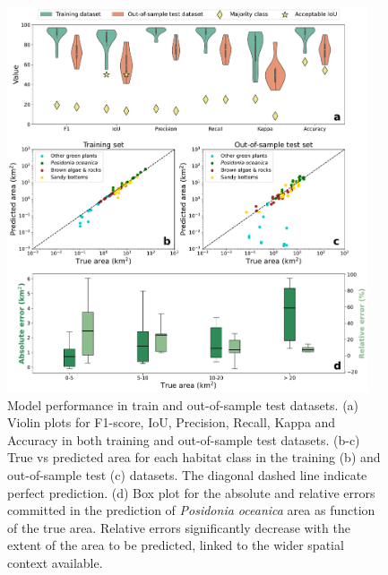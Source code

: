 \begin{figure}[H]
    \centering
    \includegraphics[width=0.95\textwidth]{Figures/Model_performance.pdf}
    \caption[Model performance in train and out-of-sample test datasets]{Model
        performance in train and out-of-sample test datasets. (a)
        Violin plots for F1-score, IoU, Precision, Recall, Kappa and Accuracy
        in both
        training and out-of-sample test datasets. (b-c) True vs predicted area
        for each
        habitat class in the training (b) and out-of-sample test (c) datasets.
        The
        diagonal dashed line indicate perfect prediction. (d) Box plot for the
        absolute
        and relative errors committed in the prediction of \textit{Posidonia
            oceanica}
        area as function of the true area. Relative errors significantly
        decrease with
        the extent of the area to be predicted, linked to the wider spatial
        context
        available.}
    \label{fig:model_performance}
\end{figure}

